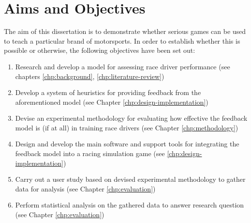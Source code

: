 \section{Aims and Objectives}
The aim of this dissertation is to demonstrate whether serious games can be used to teach a particular brand of motorsports. In order to establish whether this is possible or otherwise, the following objectives have been set out:

\begin{enumerate}
	\item Research and develop a model for assessing race driver performance (see chapters \ref{chp:background}, \ref{chp:literature-review})
	\item Develop a system of heuristics for providing feedback from the aforementioned model (see Chapter \ref{chp:design-implementation})
	\item Devise an experimental methodology for evaluating how effective the feedback model is (if at all) in training race drivers (see Chapter \ref{chp:methodology})
	\item Design and develop the main software and support tools for integrating the feedback model into a racing simulation game (see \ref{chp:design-implementation})
	\item Carry out a user study based on devised experimental methodology to gather data for analysis (see Chapter \ref{chp:evaluation})
	\item Perform statistical analysis on the gathered data to answer research question (see Chapter \ref{chp:evaluation})
\end{enumerate}

%
%

